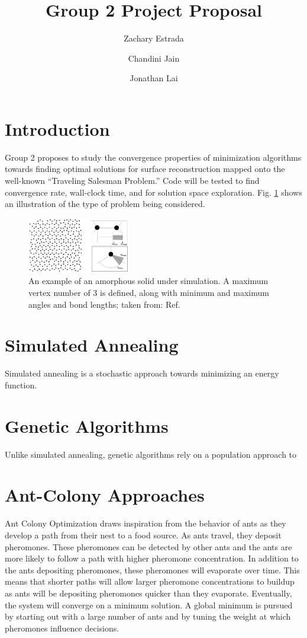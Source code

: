 \documentclass[10pt,twocolumn,notitlepage]{article}
\title{\vspace{-6ex} \textbf{Group 2 Project Proposal}}
\author{Zachary Estrada \and Chandini Jain \and Jonathan Lai}
\begin{document}
\maketitle

\section{Introduction}
Group 2 proposes to study the convergence properties of minimization algorithms towards finding optimal solutions for surface reconstruction mapped onto the well-known ``Traveling Salesman Problem.''  Code will be tested to find convergence rate, wall-clock time, and for solution space exploration. Fig. \ref{fig:amorphousSilicon} shows an illustration of the type of problem being considered.

\begin{figure}[h!]
	\centering
	\includegraphics[width=0.4\textwidth]{Figures/amorphousSilicon.png}
	\caption{An example of an amorphous solid under simulation.  A maximum vertex number of 3 is defined, along with minimum and maximum angles and bond lengths; taken from: Ref. \protect{}}
	\label{fig:amorphousSilicon}
\end{figure}


\section{Simulated Annealing}
Simulated annealing is a stochastic approach towards minimizing an energy function.

\section{Genetic Algorithms}
Unlike simulated annealing, genetic algorithms rely on a population approach to 

\section{Ant-Colony Approaches}
Ant Colony Optimization\cite{Dorigo96theant} draws inspiration from the behavior of ants as they develop a path from their nest to a food source.  As ants travel, they deposit pheromones.  These pheromones can be detected by other ants and the ants are more likely to follow a path with higher pheromone concentration.  In addition to the ants depositing pheromones, these pheromones will evaporate over time.  This means that shorter paths will allow larger pheromone concentrations to buildup as ants will be depositing pheromones quicker than they evaporate.  Eventually, the system will converge on a minimum solution.  A global minimum is pursued by starting out with a large number of ants and by tuning the weight at which pheromones influence decisions. 
\end{document}
